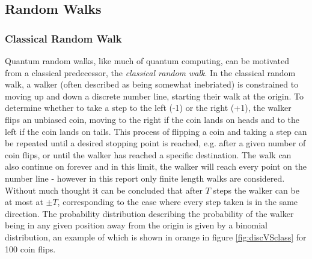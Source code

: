 \subsection{Random Walks}
\subsubsection{Classical Random Walk}
\label{subsubsection:classc_r_w}
Quantum random walks, like much of quantum computing, can be motivated from a classical predecessor, the \emph{classical random walk}.
In the classical random walk, a walker (often described as being somewhat inebriated) is constrained to moving up and down a discrete number line, starting their walk at the origin.
To determine whether to take a step to the left (-1) or the right (+1), the walker flips an unbiased coin, moving to the right if the coin lands on heads and to the left if the coin lands on tails. 
This process of flipping a coin and taking a step can be repeated until a desired stopping point is reached, e.g. after a given number of coin flips, or until the walker has reached a specific destination.
The walk can also continue on forever and in this limit, the walker will reach every point on the number line - however in this report only finite length walks are considered.
Without much thought it can be concluded that after $T$ steps the walker can be at most at $\pm T$, corresponding to the case where every step taken is in the same direction.
The probability distribution describing the probability of the walker being in any given position away from the origin is given by a binomial distribution, an example of which is shown in orange in figure \ref{fig:discVSclass} for 100 coin flips. 

